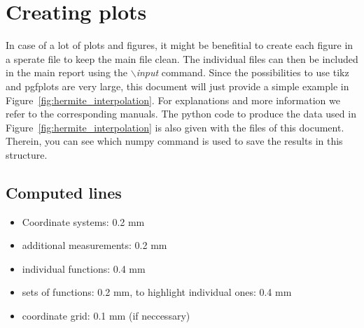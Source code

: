 \documentclass[a4paper,10pt,english]{article}
\begin{document}
\section{Creating plots}
%
In case of a lot of plots and figures, it might be benefitial to create each figure in a sperate file to keep the main file clean. The individual files can then be included in the main report using the \textit{$\backslash$input} command. Since the possibilities to use tikz and pgfplots are very large, this document will just provide a simple example in Figure~\ref{fig:hermite_interpolation}. For explanations and more information we refer to the corresponding manuals. The python code to produce the data used in Figure~\ref{fig:hermite_interpolation} is also given with the files of this document. Therein, you can see which numpy command is used to save the results in this structure.   

%

\cleardoublepage
\subsection*{Computed lines}
\begin{itemize}
	\item Coordinate systems: 0.2 mm
	\item additional measurements: 0.2 mm
	\item individual functions: 0.4 mm
	\item sets of functions: 0.2 mm, to highlight individual ones: 0.4 mm
	\item coordinate grid: 0.1 mm (if neccessary)
\end{itemize}
%
\end{document}
